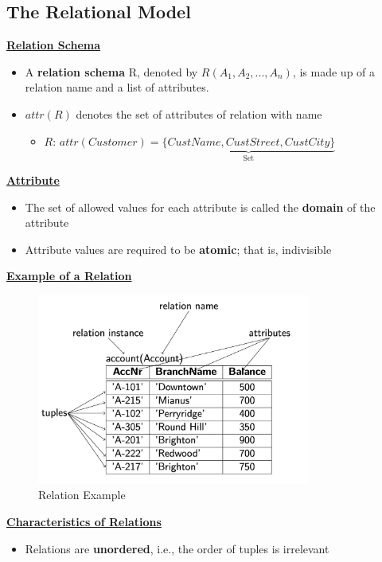 \subsection{The Relational Model}

\textbf{\underline{Relation Schema}}
\bigskip
\begin{itemize}
    \item A \textbf{relation schema} R, denoted by $R(A_1,A_2,...,A_n)$, is made up of a relation name and a list of attributes.
    \item $attr(R)$ denotes the set of attributes of relation with name 
    \begin{itemize}
        \item[] $R$: $attr(Customer) = \underbrace{\{CustName, CustStreet, CustCity\}}_\text{Set}$
    \end{itemize}
\end{itemize}

\textbf{\underline{Attribute}}
\bigskip
\begin{itemize}
    \item The set of allowed values for each attribute is called the \textbf{domain} of the attribute
    \item Attribute values are required to be \textbf{atomic}; that is, indivisible
\end{itemize}

\textbf{\underline{Example of a Relation}}
\bigskip
\begin{figure}[H]
\centering
\includegraphics[width=0.8\textwidth]{images/Screenshot 2024-05-01 at 17.58.27.jpg}
\caption{Relation Example}
\end{figure}

\textbf{\underline{Characteristics of Relations}}
\bigskip
\begin{itemize}
    \item Relations are \textbf{unordered}, i.e., the order of tuples is irrelevant
\end{itemize}

